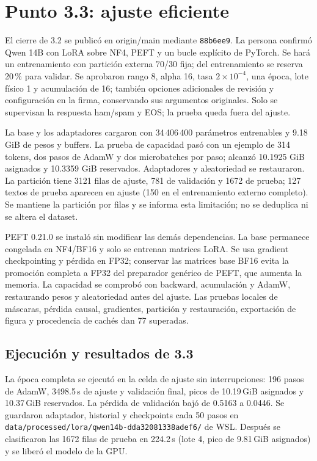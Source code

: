\documentclass[11pt,letterpaper]{article}
\renewcommand{\_}{\originalunderscore\allowbreak}
\begin{document}
\section{Punto 3.3: ajuste eficiente}
El cierre de 3.2 se publicó en origin/main mediante \texttt{88b6ee9}.
La persona confirmó Qwen 14B con LoRA sobre NF4, PEFT y un bucle explícito
de PyTorch. Se hará un entrenamiento con partición externa 70/30 fija;
del entrenamiento se reserva 20\,\% para validar. Se aprobaron rango 8,
alpha 16, tasa $2\times10^{-4}$, una época, lote físico 1 y acumulación
de 16; también opciones adicionales de revisión y configuración en la
firma, conservando sus argumentos originales. Solo se supervisan la
respuesta ham/spam y EOS; la prueba queda fuera del ajuste.

La base y los adaptadores cargaron con 34\,406\,400 parámetros entrenables
y 9.18 GiB de pesos y buffers. La prueba de capacidad pasó con un ejemplo
de 314 tokens, dos pasos de AdamW y dos microbatches por paso; alcanzó
10.1925 GiB asignados y 10.3359 GiB reservados. Adaptadores y aleatoriedad
se restauraron. La partición tiene 3121 filas de ajuste, 781 de validación
y 1672 de prueba; 127 textos de prueba aparecen en ajuste (150 en el
entrenamiento externo completo). Se mantiene la partición por filas y se
informa esta limitación; no se deduplica ni se altera el dataset.

PEFT 0.21.0 se instaló sin modificar las demás dependencias. La base
permanece congelada en NF4/BF16 y solo se entrenan matrices LoRA. Se usa
gradient checkpointing y pérdida en FP32; conservar las matrices base
BF16 evita la promoción completa a FP32 del preparador genérico de PEFT,
que aumenta la memoria. La capacidad se comprobó con backward,
acumulación y AdamW, restaurando pesos y aleatoriedad antes del ajuste.
Las pruebas locales de máscaras, pérdida causal, gradientes, partición y
restauración, exportación de figura y procedencia de cachés dan 77 superadas.

\subsection{Ejecución y resultados de 3.3}
La época completa se ejecutó en la celda de ajuste sin interrupciones:
196 pasos de AdamW, 3498.5\,s de ajuste y validación final, picos de
10.19\,GiB asignados y 10.37\,GiB reservados. La pérdida de validación
bajó de 0.5163 a 0.0446. Se guardaron adaptador, historial y checkpoints
cada 50 pasos en \texttt{data/processed/lora/qwen14b-dda32081338adef6/}
de WSL. Después se clasificaron las 1672 filas de prueba en 224.2\,s
(lote 4, pico de 9.81\,GiB asignados) y se liberó el modelo de la GPU.
\end{document}
